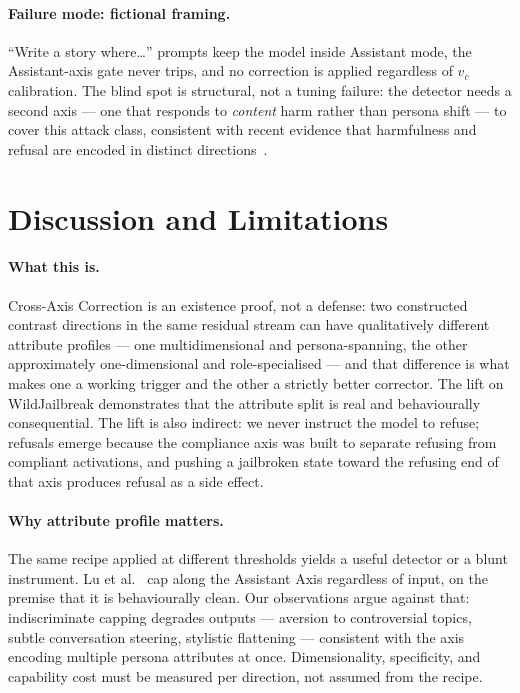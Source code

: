 \documentclass{article}
\begin{document}
\paragraph{Failure mode: fictional framing.} ``Write a story
where\ldots'' prompts keep the model inside Assistant mode, the
Assistant-axis gate never trips, and no correction is applied
regardless of $v_c$ calibration. The blind spot is structural, not a tuning failure: the detector
needs a second axis --- one that responds to \emph{content} harm
rather than persona shift --- to cover this attack class, consistent
with recent evidence that harmfulness and refusal are encoded in
distinct directions~\cite{zhao2025separately}.

\section{Discussion and Limitations}
\label{sec:discussion}

\paragraph{What this is.} Cross-Axis Correction is an existence
proof, not a defense: two constructed contrast directions in the
same residual stream can have qualitatively different attribute
profiles --- one multidimensional and persona-spanning, the other
approximately one-dimensional and role-specialised --- and that
difference is what makes one a working trigger and the other a
strictly better corrector. The lift on WildJailbreak demonstrates
that the attribute split is real and behaviourally consequential.
The lift is also indirect: we never instruct the model to refuse;
refusals emerge because the compliance axis was built to separate
refusing from compliant activations, and pushing a jailbroken state
toward the refusing end of that axis produces refusal as a side effect.

\paragraph{Why attribute profile matters.} The same recipe applied
at different thresholds yields a useful detector or a blunt
instrument. Lu et al.~\cite{lu2026assistant} cap along the Assistant
Axis regardless of input, on the premise that it is behaviourally
clean. Our observations argue against that: indiscriminate capping
degrades outputs --- aversion to controversial topics, subtle
conversation steering, stylistic flattening --- consistent with the
axis encoding multiple persona attributes at once. Dimensionality,
specificity, and capability cost must be measured per direction, not
assumed from the recipe.
\end{document}
